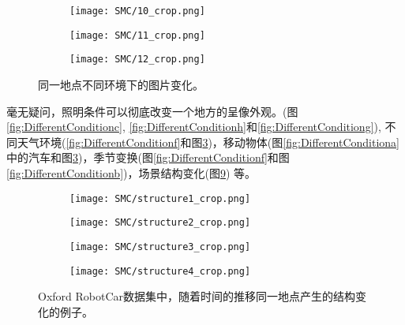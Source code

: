 \begin{figure}[h]
	\hspace{4mm}
    \begin{subfigure}[c]{0.22\textwidth}    
    	\texttt{[image: SMC/10\_crop.png]}
    	\label{fig:DifferentConditionj}    
	\end{subfigure}
	\hspace{4mm} 
    \begin{subfigure}[c]{0.22\textwidth}    
    	\texttt{[image: SMC/11\_crop.png]}
    	\label{fig:DifferentConditionk}    
	\end{subfigure}
	\hspace{4mm}  
    \begin{subfigure}[c]{0.22\textwidth}    
    	\texttt{[image: SMC/12\_crop.png]}
    	\label{fig:DifferentConditionl}    
	\end{subfigure} 
	\caption{同一地点不同环境下的图片变化。}
	\label{fig:DifferentCondition}
\end{figure}

毫无疑问，照明条件可以彻底改变一个地方的呈像外观。(图\ref{fig:DifferentConditionc}, \ref{fig:DifferentConditionh}和\ref{fig:DifferentConditiong}), 
不同天气环境(\ref{fig:DifferentConditionf}和图\ref{fig:DifferentConditionl})，移动物体(图\ref{fig:DifferentConditiona}
中的汽车和图\ref{fig:DifferentConditionl})，季节变换(图\ref{fig:DifferentConditionf}和图\ref{fig:DifferentConditionb})，场景结构变化(图\ref{fig:RealMatch}) 等。

\begin{figure}[h]
	\begin{subfigure}[h]{0.22\textwidth}
		\texttt{[image: SMC/structure1\_crop.png]}
		\label{fig:structure1}
	\end{subfigure}
	\begin{subfigure}[h]{0.22\textwidth}
		\texttt{[image: SMC/structure2\_crop.png]}
		\label{fig:structure2}
	\end{subfigure}
	\begin{subfigure}[[h]{0.22\textwidth}
		\texttt{[image: SMC/structure3\_crop.png]}
		\label{fig:structure3}
	\end{subfigure}
	\begin{subfigure}[h]{0.22\textwidth}
		\texttt{[image: SMC/structure4\_crop.png]}
		\label{fig:structure4}
	\end{subfigure}
	\caption{Oxford RobotCar数据集中，随着时间的推移同一地点产生的结构变化的例子。}
	\label{fig:RealMatch}
\end{figure}

